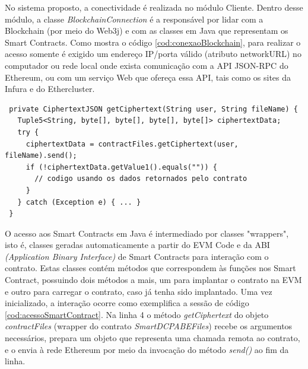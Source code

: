 \documentclass[a4paper,11pt]{article}
\begin{document}

No sistema proposto, a conectividade é realizada no módulo Cliente.
Dentro desse módulo, a classe \emph{BlockchainConnection} é a responsável por lidar com a Blockchain (por meio do Web3j) e com as classes em Java que representam os Smart Contracts. Como mostra o código \ref{cod:conexaoBlockchain}, para realizar o acesso  somente é exigido um endereço IP/porta válido (atributo networkURL) no computador ou rede local onde exista comunicação com a API JSON-RPC do Ethereum, ou com um serviço Web que ofereça essa API, tais como os sites da Infura e do Ethercluster.



\begin{lstlisting}
 private CiphertextJSON getCiphertext(String user, String fileName) {
   Tuple5<String, byte[], byte[], byte[], byte[]> ciphertextData;
   try {
     ciphertextData = contractFiles.getCiphertext(user, fileName).send();
     if (!ciphertextData.getValue1().equals("")) {
       // codigo usando os dados retornados pelo contrato
     }
   } catch (Exception e) { ... }
 }
\end{lstlisting}

O acesso aos Smart Contracts em Java é intermediado por classes "wrappers", isto é, classes geradas automaticamente a partir do EVM Code e da ABI \emph{(Application Binary Interface)} de Smart Contracts para interação com o contrato.
Estas classes contém métodos que correspondem às funções nos Smart Contract, possuindo dois métodos a mais, um para implantar o contrato na EVM e outro para carregar o contrato, caso já tenha sido implantado.
Uma vez inicializado, a interação ocorre como exemplifica a sessão de código \ref{cod:acessoSmartContract}.
Na linha 4 o método \emph{getCiphertext} do objeto \emph{contractFiles} (wrapper do contrato \emph{SmartDCPABEFiles}) recebe os argumentos necessários, prepara um objeto que representa uma chamada remota ao contrato, e o envia à rede Ethereum por meio da invocação do método \emph{send()} ao fim da linha.
\end{document}
